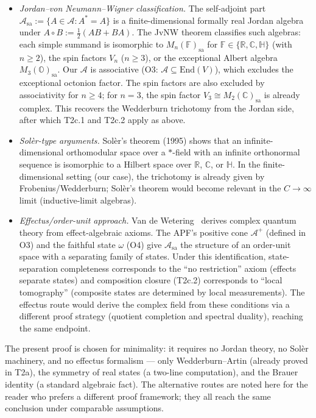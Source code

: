 \documentclass[11pt,a4paper]{article}
\theoremstyle{definition}
\newcommand{\End}{\mathrm{End}}
\begin{document}
\begin{itemize}[nosep,leftmargin=2em,itemsep=3pt]
\item \textit{Jordan--von Neumann--Wigner classification.}  The self-adjoint part $\mathcal{A}_{\mathrm{sa}} := \{A \in \mathcal{A} : A^* = A\}$ is a finite-dimensional formally real Jordan algebra under $A \circ B := \frac{1}{2}(AB + BA)$.  The JvNW theorem classifies such algebras: each simple summand is isomorphic to $M_n(\mathbb{F})_{\mathrm{sa}}$ for $\mathbb{F} \in \{\mathbb{R}, \mathbb{C}, \mathbb{H}\}$ (with $n \ge 2$), the spin factors $V_n$ ($n \ge 3$), or the exceptional Albert algebra $M_3(\mathbb{O})_{\mathrm{sa}}$.  Our $\mathcal{A}$ is associative (O3: $\mathcal{A} \subseteq \End(V)$), which excludes the exceptional octonion factor.  The spin factors are also excluded by associativity for $n \ge 4$; for $n = 3$, the spin factor $V_3 \cong M_2(\mathbb{C})_{\mathrm{sa}}$ is already complex.  This recovers the Wedderburn trichotomy from the Jordan side, after which T2c.1 and T2c.2 apply as above.
\item \textit{Sol\`er-type arguments.}  Sol\`er's theorem (1995) shows that an infinite-dimensional orthomodular space over a $*$-field with an infinite orthonormal sequence is isomorphic to a Hilbert space over $\mathbb{R}$, $\mathbb{C}$, or $\mathbb{H}$.  In the finite-dimensional setting (our case), the trichotomy is already given by Frobenius/Wedderburn; Sol\`er's theorem would become relevant in the $C \to \infty$ limit (inductive-limit algebras).
\item \textit{Effectus/order-unit approach.}  Van de Wetering~\cite{vandeWetering2019} derives complex quantum theory from effect-algebraic axioms.  The APF's positive cone $\mathcal{A}^+$ (defined in O3) and the faithful state $\omega$ (O4) give $\mathcal{A}_{\mathrm{sa}}$ the structure of an order-unit space with a separating family of states.  Under this identification, state-separation completeness corresponds to the ``no restriction'' axiom (effects separate states) and composition closure (T2c.2) corresponds to ``local tomography'' (composite states are determined by local measurements).  The effectus route would derive the complex field from these conditions via a different proof strategy (quotient completion and spectral duality), reaching the same endpoint.
\end{itemize}

\noindent The present proof is chosen for minimality: it requires no Jordan theory, no Sol\`er machinery, and no effectus formalism --- only Wedderburn--Artin (already proved in T2a), the symmetry of real states (a two-line computation), and the Brauer identity (a standard algebraic fact).  The alternative routes are noted here for the reader who prefers a different proof framework; they all reach the same conclusion under comparable assumptions.
\end{document}
